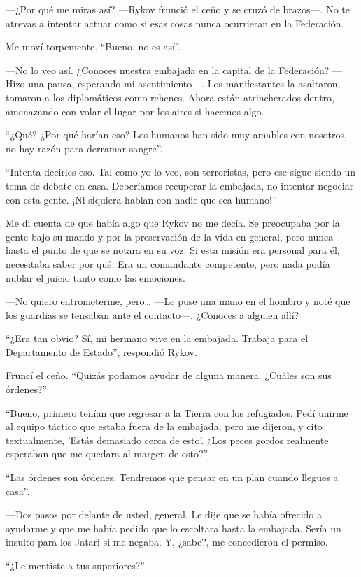—¿Por qué me miras así? —Rykov frunció el ceño y se cruzó de brazos—. No te atrevas a intentar actuar como si esas cosas nunca ocurrieran en la Federación.

Me moví torpemente. ``Bueno, no es así''.

—No lo veo así. ¿Conoces nuestra embajada en la capital de la Federación? —Hizo una pausa, esperando mi asentimiento—. Los manifestantes la asaltaron, tomaron a los diplomáticos como rehenes. Ahora están atrincherados dentro, amenazando con volar el lugar por los aires si hacemos algo.

``¿Qué? ¿Por qué harían eso? Los humanos han sido muy amables con nosotros, no hay razón para derramar sangre''.

``Intenta decirles eso. Tal como yo lo veo, son terroristas, pero ese sigue siendo un tema de debate en casa. Deberíamos recuperar la embajada, no intentar negociar con esta gente. ¡Ni siquiera hablan con nadie que sea humano!''


Me di cuenta de que había algo que Rykov no me decía. Se preocupaba por la gente bajo su mando y por la preservación de la vida en general, pero nunca hasta el punto de que se notara en su voz. Si esta misión era personal para él, necesitaba saber por qué. Era un comandante competente, pero nada podía nublar el juicio tanto como las emociones.

—No quiero entrometerme, pero… —Le puse una mano en el hombro y noté que los guardias se tensaban ante el contacto—. ¿Conoces a alguien allí?

``¿Era tan obvio? Sí, mi hermano vive en la embajada. Trabaja para el Departamento de Estado'', respondió Rykov.

Fruncí el ceño. ``Quizás podamos ayudar de alguna manera. ¿Cuáles son sus órdenes?''


``Bueno, primero tenían que regresar a la Tierra con los refugiados. Pedí unirme al equipo táctico que estaba fuera de la embajada, pero me dijeron, y cito textualmente, 'Estás demasiado cerca de esto'. ¿Los peces gordos realmente esperaban que me quedara al margen de esto?''


``Las órdenes son órdenes. Tendremos que pensar en un plan cuando llegues a casa''.

—Dos pasos por delante de usted, general. Le dije que se había ofrecido a ayudarme y que me había pedido que lo escoltara hasta la embajada. Sería un insulto para los Jatari si me negaba. Y, ¿sabe?, me concedieron el permiso.

``¿Le mentiste a tus superiores?''


